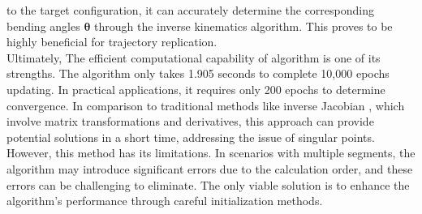 to the target configuration, it can accurately determine the corresponding bending angles $\boldsymbol{\theta}$ through the 
inverse kinematics algorithm. This proves to be highly beneficial for trajectory replication. \\
Ultimately, The efficient computational capability of algorithm is one of its strengths. The algorithm only 
takes 1.905 seconds to complete 10,000 epochs updating. In practical applications, it requires only 200 epochs 
to determine convergence. In comparison to traditional methods like inverse Jacobian \cite{inverse_jacobian}, 
which involve matrix transformations and derivatives, this approach can provide potential solutions in a short 
time, addressing the issue of singular points. However, this method has its limitations. In scenarios with 
multiple segments, the algorithm may introduce significant errors due to the calculation order, and these errors 
can be challenging to eliminate. The only viable solution is to enhance the algorithm's performance through 
careful initialization methods.
